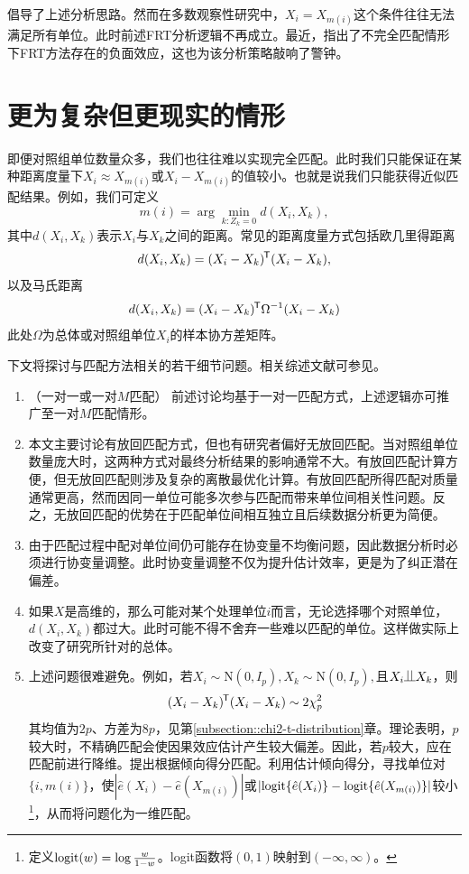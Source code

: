 \citet{rosenbaum2002design}倡导了上述分析思路。然而在多数观察性研究中，$X_i = X_{m(i)}$这个条件往往无法满足所有单位。此时前述FRT分析逻辑不再成立。最近，\citet{guo2022statistical}指出了不完全匹配情形下FRT方法存在的负面效应，这也为该分析策略敲响了警钟。 
 


\section{更为复杂但更现实的情形}

即便对照组单位数量众多，我们也往往难以实现完全匹配。此时我们只能保证在某种距离度量下$X_i \approx X_{m(i)}  $或$X_i -X_{m(i)} $的值较小。也就是说我们只能获得近似匹配结果。例如，我们可定义
$$
m(i) = \arg\min_{k:Z_k = 0} d(X_i ,X_k), 
$$
其中$d(X_i ,X_k)$表示$X_i$与$X_k$之间的距离。常见的距离度量方式包括欧几里得距离
$$
d(X_i ,X_k) =  (X_i - X_k)^{\mkern-1.5mu\mathsf{T}} ( X_i - X_k),
$$
以及马氏距离
$$
d(X_i ,X_k) =(X_i - X_k)^{\mkern-1.5mu\mathsf{T}} \Omega^{-1} (X_i - X_k)
$$
此处$\Omega$为总体或对照组单位$X_i$的样本协方差矩阵。 


下文将探讨与匹配方法相关的若干细节问题。相关综述文献可参见\citet{stuart2010matching}。 
\begin{enumerate}
\item
（一对一或一对$M$匹配）
前述讨论均基于一对一匹配方式，上述逻辑亦可推广至一对$M$匹配情形。


\item
本文主要讨论有放回匹配方式，但也有研究者偏好无放回匹配。当对照组单位数量庞大时，这两种方式对最终分析结果的影响通常不大。有放回匹配计算方便，但无放回匹配则涉及复杂的离散最优化计算。有放回匹配所得匹配对质量通常更高，然而因同一单位可能多次参与匹配而带来单位间相关性问题。反之，无放回匹配的优势在于匹配单位间相互独立且后续数据分析更为简便。 


\item
由于匹配过程中配对单位间仍可能存在协变量不均衡问题，因此数据分析时必须进行协变量调整。此时协变量调整不仅为提升估计效率，更是为了纠正潜在偏差。

\item
如果$X$是高维的，那么可能对某个处理单位$i$而言，无论选择哪个对照单位，$d(X_i ,X_k)$都过大。此时可能不得不舍弃一些难以匹配的单位。这样做实际上改变了研究所针对的总体。  


\item
上述问题很难避免。例如，若$X_i \sim \text{N}(0, I_p), X_k \sim\text{N}(0, I_p) ,$且$X_i \ind X_k$，则$$
(X_i - X_k)^{\mkern-1.5mu\mathsf{T}} (X_i - X_k) \sim    2 \chi^2_p
$$其均值为$2p$、方差为$8p$，见第\ref{subsection::chi2-t-distribution}章。理论表明，$p$较大时，不精确匹配会使因果效应估计产生较大偏差。因此，若$p$较大，应在匹配前进行降维。\citet{rosenbaum1983central}提出根据倾向得分匹配。利用估计倾向得分，寻找单位对$\{ i, m(i)\}$，使$ |  \hat{e}(X_i) -  \hat{e}(X_{m(i)})  |$或$| \textup{logit}\{ \hat{e}(X_i)\} - \textup{logit}\{ \hat{e}(X_{m(i)}) \} | $较小\footnote{定义$\textup{logit}(w) = \log \frac{w}{1-w}$。logit函数将$(0,1)$映射到$(-\infty, \infty)$。}，从而将问题化为一维匹配。 
\end{enumerate}


